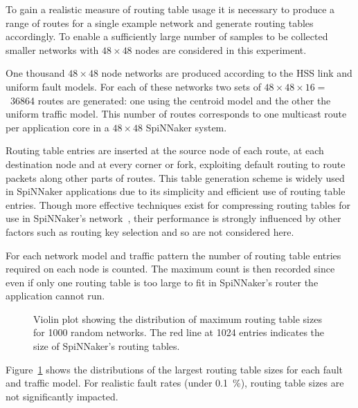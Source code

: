 			To gain a realistic measure of routing table usage it is necessary to
			produce a range of routes for a single example network and generate
			routing tables accordingly.  To enable a sufficiently large number of
			samples to be collected smaller networks with $48\times48$ nodes are
			considered in this experiment.
			
			One thousand $48\times48$ node networks are produced according to the HSS
			link and uniform fault models. For each of these networks two sets of
			$48\times48\times16=$~\num{36864} routes are generated: one using the
			centroid model and the other the uniform traffic model. This number of
			routes corresponds to one multicast route per application core in a
			$48\times48$ SpiNNaker system.
			
			Routing table entries are inserted at the source node of each route, at
			each destination node and at every corner or fork, exploiting default
			routing to route packets along other parts of routes. This table
			generation scheme is widely used in SpiNNaker applications due to its
			simplicity and efficient use of routing table entries. Though more
			effective techniques exist for compressing routing tables for use in
			SpiNNaker's network~\cite{mundy16}, their performance is strongly
			influenced by other factors such as routing key selection and so are not
			considered here.
			
			For each network model and traffic pattern the number of routing table
			entries required on each node is counted. The maximum count is then
			recorded since even if only one routing table is too large to fit in
			SpiNNaker's router the application cannot run.
			
			\begin{figure}
				\center
				
				\caption[Routing table sizes for \num{1000} random networks.]%
				{Violin plot showing the distribution of maximum routing table
				sizes for \num{1000} random networks. The red line at \num{1024}
				entries indicates the size of SpiNNaker's routing tables.}
				\label{fig:routing-entries}
			\end{figure}
			
			Figure~\ref{fig:routing-entries} shows the distributions of the largest
			routing table sizes for each fault and traffic model. For realistic fault
			rates (under \SI{0.1}{\percent}), routing table sizes are not
			significantly impacted.
			
